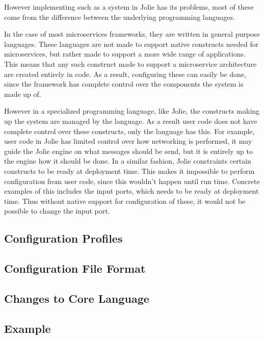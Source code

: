
However implementing such as a system in Jolie has its problems, most of these
come from the difference between the underlying programming languages. 

In the case of most microservices frameworks, they are written in general
purpose languages. These languages are not made to support native constructs
needed for microservices, but rather made to support a more wide range of
applications.  This means that any such construct made to support a
microservice architecture are created entirely in code. As a result,
configuring these can easily be done, since the framework has complete control
over the components the system is made up of.

However in a specialized programming language, like Jolie, the constructs
making up the system are managed by the language. As a result user code does
not have complete control over these constructs, only the language has this.
For example, user code in Jolie has limited control over how networking is
performed, it may guide the Jolie engine on what messages should be send, but
it is entirely up to the engine how it should be done. In a similar fashion,
Jolie constraints certain constructs to be ready at deployment time. This makes
it impossible to perform configuration from user code, since this wouldn't
happen until run time. Concrete examples of this includes the input ports,
which needs to be ready at deployment time. Thus without native support for
configuration of these, it would not be possible to change the input port.

\subsection{Configuration Profiles}

\subsection{Configuration File Format}

\subsection{Changes to Core Language}

\subsection{Example}

